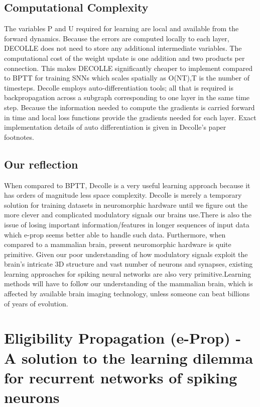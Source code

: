 \documentclass[12pt]{report}
\begin{document}
\subsection{Computational Complexity}
The variables P and U required for learning are local and available from the forward dynamics. Because the errors are computed locally to each layer, DECOLLE does not need to store any additional intermediate variables.  The computational cost of the weight update is one addition and two products per connection. This makes DECOLLE significantly cheaper to implement compared to BPTT for training SNNs which scales spatially as O(NT),T is the number of timesteps. Decolle employs auto-differentiation tools; all that is required is backpropagation across a subgraph corresponding to one layer in the same time step. Because the information needed to compute the gradients is carried forward in time and local loss functions provide the gradients needed for each layer. Exact implementation details of auto differentiation is given in Decolle's paper footnotes.
\subsection{Our reflection}
When compared to BPTT, Decolle is a very useful learning approach because it has orders of magnitude less space complexity. Decolle is merely a temporary solution for training datasets in neuromorphic hardware until we figure out the more clever and complicated modulatory signals our brains use.There is also the issue of losing important information/features in longer sequences of input data which e-prop seems better able to handle such data. Furthermore, when compared to a mammalian brain, present neuromorphic hardware is quite primitive. Given our poor understanding of how modulatory signals exploit the brain's intricate 3D structure and vast number of neurons and synapses, existing learning approaches for spiking neural networks are also very primitive.Learning methods will have to follow our understanding of the mammalian brain, which is affected by available brain imaging technology, unless someone can beat billions of years of evolution.




\section{Eligibility Propagation (e-Prop) - A solution to the learning dilemma for recurrent networks of spiking neurons}
\end{document}
